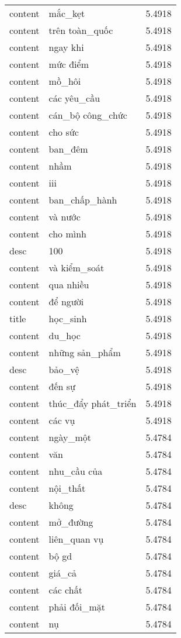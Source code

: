 \documentclass{article}
\begin{document}
\begin{tabular}{lll}
content & mắc\_kẹt & 5.4918\\
content & trên toàn\_quốc & 5.4918\\
content & ngay khi & 5.4918\\
content & mức điểm & 5.4918\\
content & mồ\_hôi & 5.4918\\
content & các yêu\_cầu & 5.4918\\
content & cán\_bộ công\_chức & 5.4918\\
content & cho sức & 5.4918\\
content & ban\_đêm & 5.4918\\
content & nhầm & 5.4918\\
content & iii & 5.4918\\
content & ban\_chấp\_hành & 5.4918\\
content & và nước & 5.4918\\
content & cho mình & 5.4918\\
desc & 100 & 5.4918\\
content & và kiểm\_soát & 5.4918\\
content & qua nhiều & 5.4918\\
content & để người & 5.4918\\
title & học\_sinh & 5.4918\\
content & du\_học & 5.4918\\
content & những sản\_phẩm & 5.4918\\
desc & bảo\_vệ & 5.4918\\
content & đến sự & 5.4918\\
content & thúc\_đẩy phát\_triển & 5.4918\\
content & các vụ & 5.4918\\
content & ngày\_một & 5.4784\\
content & văn & 5.4784\\
content & nhu\_cầu của & 5.4784\\
content & nội\_thất & 5.4784\\
desc & không & 5.4784\\
content & mở\_đường & 5.4784\\
content & liên\_quan vụ & 5.4784\\
content & bộ gd & 5.4784\\
content & giá\_cả & 5.4784\\
content & các chất & 5.4784\\
content & phải đối\_mặt & 5.4784\\
content & nụ & 5.4784\\

\end{tabular}
\end{document}
